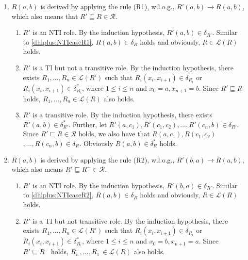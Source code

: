 \documentclass[final,1p,times]{elsarticle}
\begin{document}
\begin{enumerate}[leftmargin=12ex,label=Case~2.\arabic*, ref=Case~2.\arabic*]
\item $R(a,b)$ is derived by applying the rule (R1), w.l.o.g., $R'(a,b)\rightarrow R(a,b)$,
    which also means that $R'\sqsubseteq R\in\mathcal{R}$.

    \begin{enumerate}[leftmargin=8ex,label=Case~2.1.\arabic*]
    \item $R'$ is an NTI role. By the induction hypothesis, $R'(a,b)\in\delta_{R'}$.
        Similar to \ref{dhlplus:NTIcaseR1}, $R(a,b)\in\delta_{R}$ holds and
        obviously, $R\in\mathcal{L}(R)$ holds.

    \item $R'$ is a TI but not a transitive role.
        By the induction hypothesis, there exists $R_1,...,R_n\in\mathcal{L}(R')$
        such that $R_i(x_i,x_{i+1})\in\delta_{R_i}$ or $R_i(x_i,x_{i+1})\in\delta^*_{R_i}$, where $1\leq i\leq n$
        and $x_0=a, x_{n+1}=b$. Since $R'\sqsubseteq R$ holds, $R_1,...,R_n\in\mathcal{L}(R)$ also holds.

    \item $R'$ is a transitive role.
        By the induction hypothesis, there exists $R'(a,b)\in\delta^*_{R'}$.
        Further, let $R'(a,c_1),R'(c_1,c_2),...,R'(c_n,b)\in\delta_{R'}$.
        Since $R'\sqsubseteq R\in\mathcal{R}$ holds, we also have that
        $R(a,c_1),R(c_1,c_2)$ $,...,R(c_n,b)\in\delta_{R}$. Obviously $R(a,b)\in\delta^*_{R}$ holds.
    \end{enumerate}

\item $R(a,b)$ is derived by applying the rule (R2), w.l.o.g., $R'(b,a)\rightarrow R(a,b)$,
    which also means $R'\sqsubseteq R^-\in\mathcal{R}$.

    \begin{enumerate}[leftmargin=8ex,label=Case~2.2.\arabic*]
    \item $R'$ is an NTI role. By the induction hypothesis, $R'(b,a)\in\delta_{R'}$.
        Similar to \ref{dhlplus:NTIcaseR2}, $R(a,b)\in\delta_{R}$ holds and
        obviously, $R\in\mathcal{L}(R)$ holds.

    \item $R'$ is a TI but not transitive role. By the induction hypothesis, there exists $R_1,...,R_n\in\mathcal{L}(R')$
        such that $R_i(x_i,x_{i+1})\in\delta_{R_i}$ or $R_i(x_i,x_{i+1})\in\delta^*_{R_i}$, where $1\leq i\leq n$
        and $x_0=b, x_{n+1}=a$. Since $R'\sqsubseteq R^-$ holds, $R_n^-,...,R_1^-\in\mathcal{L}(R)$ also holds.


\end{enumerate}
\end{enumerate}
\end{document}

